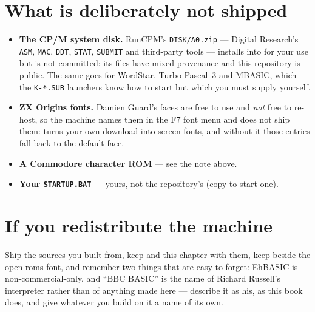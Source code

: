 \section{What is deliberately not shipped}
\begin{itemize}[leftmargin=1.4em]
\item \textbf{The CP/M system disk.} RunCPM's \verb|DISK/A0.zip| ---
  Digital Research's \verb|ASM|, \verb|MAC|, \verb|DDT|, \verb|STAT|,
  \verb|SUBMIT| and third-party tools --- installs into
   for your use but is not committed: its files have
  mixed provenance and this repository is public. The same goes for
  WordStar, Turbo Pascal~3 and MBASIC, which the \verb|K-*.SUB|
  launchers know how to start but which you must supply yourself.
\item \textbf{ZX Origins fonts.} Damien Guard's faces are free to use
  and \emph{not} free to re-host, so the machine names them in the F7
  font menu and does not ship them:  turns your
  own download into screen fonts, and without it those entries fall back
  to the default face.
\item \textbf{A Commodore character ROM} --- see the note above.
\item \textbf{Your \texttt{STARTUP.BAT}} --- yours, not the repository's
  (copy  to start one).
\end{itemize}

\section{If you redistribute the machine}
Ship the sources you built from, keep  and this
chapter with them, keep  beside the open-roms font,
and remember two things that are easy to forget: EhBASIC is
non-commercial-only, and ``BBC BASIC'' is the name of Richard Russell's
interpreter rather than of anything made here --- describe it as his,
as this book does, and give whatever you build on it a name of its own.

